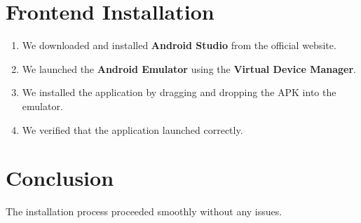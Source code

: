 \section{Frontend Installation}
\begin{enumerate}
    \item We downloaded and installed \textbf{Android Studio} from the official website.
    \item We launched the \textbf{Android Emulator} using the \textbf{Virtual Device Manager}.
    \item We installed the application by dragging and dropping the APK into the emulator.
    \item We verified that the application launched correctly.
\end{enumerate}

\section{Conclusion}
The installation process proceeded smoothly without any issues.


